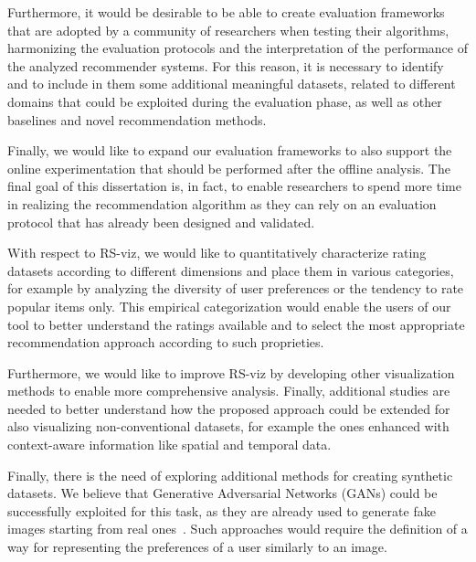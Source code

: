 Furthermore, it would be desirable to be able to create evaluation frameworks that are adopted by a community of researchers when testing their algorithms, harmonizing the evaluation protocols and the interpretation of the performance of the analyzed recommender systems. For this reason, it is necessary to identify and to include in them some additional meaningful datasets, related to different domains that could be exploited during the evaluation phase, as well as other baselines and novel recommendation methods.

Finally, we would like to expand our evaluation frameworks to also support the online experimentation that should be performed after the offline analysis. The final goal of this dissertation is, in fact, to enable researchers to spend more time in realizing the recommendation algorithm as they can rely on an evaluation protocol that has already been designed and validated.

With respect to RS-viz, we would like to quantitatively characterize rating datasets according to different dimensions and place them in various categories, for example by analyzing the diversity of user preferences or the tendency to rate popular items only. This empirical categorization would enable the users of our tool to better understand the ratings available and to select the most appropriate recommendation approach according to such proprieties.

Furthermore, we would like to improve RS-viz by developing other visualization methods to enable more comprehensive analysis. Finally, additional studies are needed to better understand how the proposed approach could be extended for also visualizing non-conventional datasets, for example the ones enhanced with context-aware information like spatial and temporal data.

Finally, there is the need of exploring additional methods for creating synthetic datasets. We believe that Generative Adversarial Networks (GANs) could be successfully exploited for this task, as they are already used to generate fake images starting from real ones~\cite{Goodfellow2014}. Such approaches would require the definition of a way for representing the preferences of a user similarly to an image.
